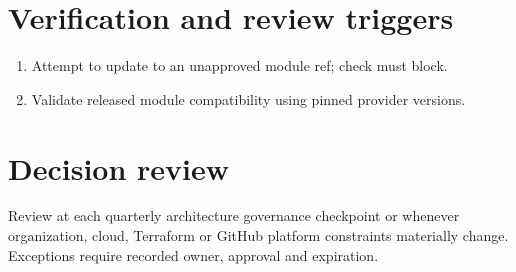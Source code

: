 \documentclass[11pt]{article}
\begin{document}
\section*{Verification and review triggers}
\begin{enumerate}[leftmargin=*]
\item Attempt to update to an unapproved module ref; check must block.
\item Validate released module compatibility using pinned provider versions.
\end{enumerate}
\section*{Decision review}
Review at each quarterly architecture governance checkpoint or whenever organization, cloud, Terraform or GitHub platform constraints materially change. Exceptions require recorded owner, approval and expiration.
\end{document}

